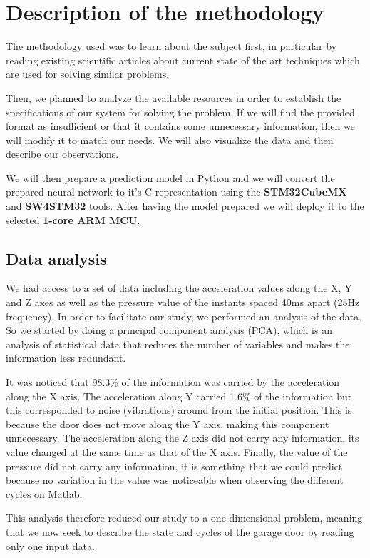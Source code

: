 \documentclass[12pt, letterpaper]{article}
\begin{document}
\newpage
\section{Description of the methodology}
The methodology used was to learn about the subject first, in particular by reading existing scientific articles about current state of the art techniques which are used for solving similar problems.

Then, we planned to analyze the available resources in order to establish the specifications of our system for solving the problem. If we will find the provided format as insufficient or that it contains some unnecessary information, then we will modify it to match our needs. We will also visualize the data and then describe our observations.

We will then prepare a prediction model in Python and we will convert the prepared neural network to it's C representation using the \textbf{STM32CubeMX} and \textbf{SW4STM32} tools. After having the model prepared we will deploy it to the selected \textbf{1-core ARM MCU}.


\subsection{Data analysis}\label{data-analysis}
We had access to a set of data including the acceleration values along the X, Y and Z axes as well as the pressure value of the instants spaced 40ms apart (25Hz frequency). In order to facilitate our study, we performed an analysis of the data. So we started by doing a principal component analysis (PCA), which is an analysis of statistical data that reduces the number of variables and makes the information less redundant. 

It was noticed that 98.3\% of the information was carried by the acceleration along the X axis. The acceleration along Y carried 1.6\% of the information but this corresponded to noise (vibrations) around from the initial position. This is because the door does not move along the Y axis, making this component unnecessary. The acceleration along the Z axis did not carry any information, its value changed at the same time as that of the X axis. Finally, the value of the pressure did not carry any information, it is something that we could predict because no variation in the value was noticeable when observing the different cycles on Matlab.

This analysis therefore reduced our study to a one-dimensional problem, meaning that we now seek to describe the state and cycles of the garage door by reading only one input data.
\end{document}
